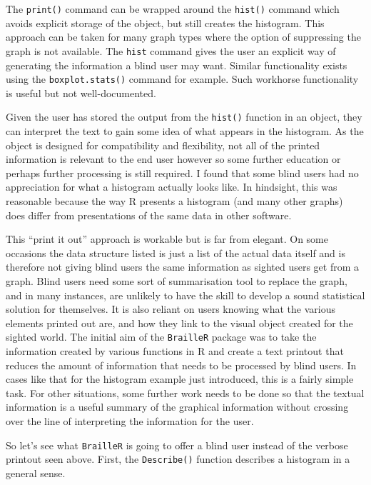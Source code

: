 \documentclass[
]{book}
\begin{document}
The \texttt{print()} command can be wrapped around the \texttt{hist()} command which avoids explicit storage of the object, but still creates the histogram. This approach can be taken for many graph types where the option of suppressing the graph is not available. The \texttt{hist} command gives the user an explicit way of generating the information a blind user may want. Similar functionality exists using the \texttt{boxplot.stats()} command for example. Such workhorse functionality is useful but not well-documented.

Given the user has stored the output from the \texttt{hist()} function in an object, they can interpret the text to gain some idea of what appears in the histogram. As the object is designed for compatibility and flexibility, not all of the printed information is relevant to the end user however so some further education or perhaps further processing is still required. I found that some blind users had no appreciation for what a histogram actually looks like. In hindsight, this was reasonable because the way R presents a histogram (and many other graphs) does differ from presentations of the same data in other software.

This ``print it out'' approach is workable but is far from elegant. On some occasions the data structure listed is just a list of the actual data itself and is therefore not giving blind users the same information as sighted users get from a graph. Blind users need some sort of summarisation tool to replace the graph, and in many instances, are unlikely to have the skill to develop a sound statistical solution for themselves. It is also reliant on users knowing what the various elements printed out are, and how they link to the visual object created for the sighted world. The initial aim of the \texttt{BrailleR} package was to take the information created by various functions in R and create a text printout that reduces the amount of information that needs to be processed by blind users.
In cases like that for the histogram example just introduced, this is a fairly simple task.
For other situations, some further work needs to be done so that the textual information is a useful summary of the graphical information without crossing over the line of interpreting the information for the user.

So let's see what \texttt{BrailleR} is going to offer a blind user instead of the verbose printout seen above. First, the \texttt{Describe()} function describes a histogram in a general sense.
\end{document}
